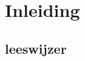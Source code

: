 \chapter{Inleiding} \label{ch:inleiding} %

\label{ch:Inleiding} %
\lipsum[01]

\section{leeswijzer} \label{sec:leeswijzer}

